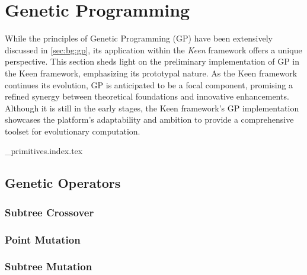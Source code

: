 
\section{Genetic Programming}
\label{sec:keen:gp}
  While the principles of Genetic Programming (GP) have been extensively 
  discussed in \vref{sec:bg:gp}, its application within the \textit{Keen} 
  framework offers a unique perspective. This section sheds light on the 
  preliminary implementation of GP in the Keen framework, emphasizing its 
  prototypal nature. As the Keen framework continues its evolution, GP is 
  anticipated to be a focal component, promising a refined synergy between 
  theoretical foundations and innovative enhancements. Although it is still in 
  the early stages, the Keen framework's GP implementation showcases the 
  platform's adaptability and ambition to provide a comprehensive toolset for 
  evolutionary computation.

  {_primitives.index.tex}

  \subsection{Genetic Operators}
  \label{sec:keen:gp:op}

  \subsubsection{Subtree Crossover}
  \label{sec:keen:gp:op:cx:subtree}
  \Blindtext

  \subsubsection{Point Mutation}
  \label{sec:keen:gp:op:mutation:point}
  \Blindtext

  \subsubsection{Subtree Mutation}
  \label{sec:keen:op:mut:subtree}
  \Blindtext